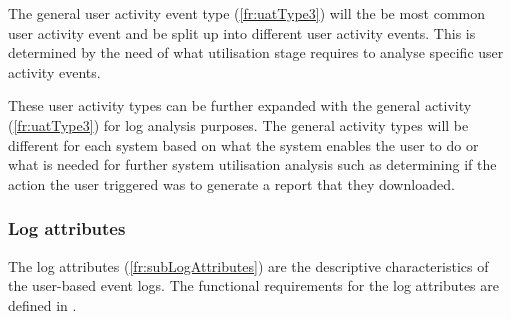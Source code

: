 The general user activity event type (\ref{fr:uatType3}) will the be most common user activity event and be split up into different user activity events. This is determined by the need of what utilisation stage requires to analyse specific user activity events. \par These user activity types can be further expanded with the general activity (\ref{fr:uatType3}) for log analysis purposes. The general activity types will be different for each system based on what the system enables the user to do or what is needed for further system utilisation analysis such as determining if the action the user triggered was to generate a report that they downloaded.

\subsubsection{Log attributes}\label{sec:ch2_logAttributes}
The log attributes (\ref{fr:subLogAttributes}) are the descriptive characteristics of the user-based event logs. The functional requirements for the log attributes are defined in .

\clearpage

